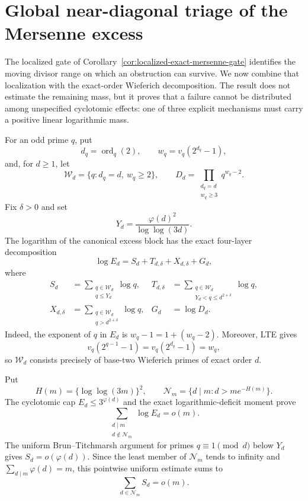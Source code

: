 \section{Global near-diagonal triage of the Mersenne excess}
\label{sec:mersenne-near-diagonal-triage}

The localized gate of
Corollary~\ref{cor:localized-exact-mersenne-gate} identifies the moving
divisor range on which an obstruction can survive.  We now combine that
localization with the exact-order Wieferich decomposition.  The result does
not estimate the remaining mass, but it proves that a failure cannot be
distributed among unspecified cyclotomic effects: one of three explicit
mechanisms must carry a positive linear logarithmic mass.

For an odd prime $q$, put
\[
 d_q=\operatorname{ord}_q(2),\qquad
 w_q=v_q(2^{d_q}-1),
\]
and, for $d\ge1$, let
\[
 \mathcal W_d=\{q:d_q=d,\ w_q\ge2\},\qquad
 D_d=\prod_{\substack{d_q=d\\w_q\ge3}}q^{w_q-2}.
\]
Fix $\delta>0$ and set
\[
 Y_d=\frac{\varphi(d)^2}{\log\log(3d)}.
\]
The logarithm of the canonical excess block has the exact four-layer
decomposition
\begin{equation}\label{eq:four-layer-mersenne-block}
 \log E_d=S_d+T_{d,\delta}+X_{d,\delta}+G_d,
\end{equation}
where
\[
\begin{aligned}
 S_d&=\sum_{\substack{q\in\mathcal W_d\\q\le Y_d}}\log q,
&T_{d,\delta}&=\sum_{\substack{q\in\mathcal W_d\\
      Y_d<q\le d^{2+\delta}}}\log q,\\
 X_{d,\delta}&=\sum_{\substack{q\in\mathcal W_d\\
      q>d^{2+\delta}}}\log q,
&G_d&=\log D_d.
\end{aligned}
\]
Indeed, the exponent of $q$ in $E_d$ is
$w_q-1=1+(w_q-2)$.  Moreover, LTE gives
\[
 v_q(2^{q-1}-1)=v_q(2^{d_q}-1)=w_q,
\]
so $\mathcal W_d$ consists precisely of base-two Wieferich primes of exact
order $d$.

Put
\[
 H(m)=\{\log\log(3m)\}^2,
 \qquad
 \mathcal N_m=\{d\mid m:d>m e^{-H(m)}\}.
\]
The cyclotomic cap $E_d\le3^{\varphi(d)}$ and the exact logarithmic-deficit
moment prove
\begin{equation}\label{eq:far-mersenne-mass-small}
 \sum_{\substack{d\mid m\\d\notin\mathcal N_m}}\log E_d=o(m).
\end{equation}
The uniform Brun--Titchmarsh argument for primes $q\equiv1\pmod d$ below
$Y_d$ gives $S_d=o(\varphi(d))$.  Since the least member of
$\mathcal N_m$ tends to infinity and
$\sum_{d\mid m}\varphi(d)=m$, this pointwise uniform estimate sums to
\begin{equation}\label{eq:near-small-wieferich-mass}
                     \sum_{d\in\mathcal N_m}S_d=o(m).
\end{equation}


